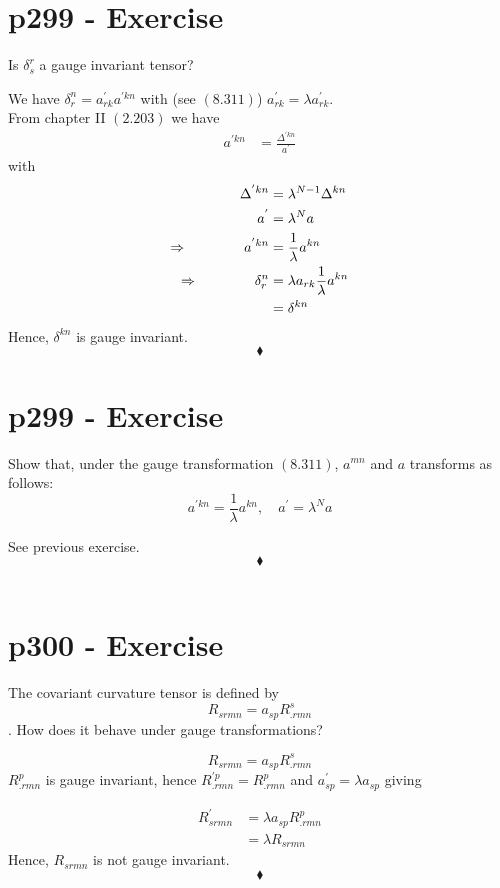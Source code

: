 \section{p299 - Exercise}
\begin{tcolorbox}
Is $\delta^r_s$ a gauge invariant tensor?
\end{tcolorbox}
We have $\delta^n_r = a^{'}_{rk} a^{'kn} $ with (see $\mathbf{(8.311)}$) $a^{'}_{rk}= \lambda a^{'}_{rk} $.\\
From chapter II $\mathbf{(2.203)}$ we have 
\begin{align}
a^{'kn} &= \frac{\Delta^{'kn}}{a^{'}}
\end{align}
with
\begin{align}
\Delta^{'kn} &= \lambda^{N-1}\Delta^{kn}\\
a^{'}&= \lambda^N a\\
\Rightarrow\quad\quad\quad\quad a^{'kn} &= \frac{ 1}{\lambda} a^{kn}\\
\Rightarrow\quad\quad\quad\quad \delta^n_r &= \lambda a_{rk}\frac{ 1}{\lambda} a^{kn}\\
&= \delta^{kn} 
\end{align}
Hence, $ \delta^{kn} $ is gauge invariant.
$$\blacklozenge$$
\newpage
\section{p299 - Exercise}
\begin{tcolorbox}
Show that, under the gauge transformation $\mathbf{(8.311)}$, $a^{mn}$ and $a$ transforms as follows:
$$a^{'kn} = \frac{ 1}{\lambda} a^{kn},\quad a^{'}= \lambda^N a $$
\end{tcolorbox}
See previous exercise.
$$\blacklozenge$$\\

\section{p300 - Exercise}
\begin{tcolorbox}
The covariant curvature tensor is defined by $$R_{srmn} = a_{sp}R^s_{.rmn}$$.
How does it behave under gauge transformations?
\end{tcolorbox}
 $$R_{srmn} = a_{sp}R^s_{.rmn}$$
 $R^p_{.rmn} $ is gauge invariant, hence $R^{'p}_{.rmn} =R^p_{.rmn} $ and $a^{'}_{sp}= \lambda a^{}_{sp} $ giving
 
 \begin{align}
 R^{'}_{srmn} &=\lambda a^{}_{sp}R^p_{.rmn}\\
 &=\lambda R_{srmn}
 \end{align}
 Hence, $R_{srmn}$ is not gauge invariant.
$$\blacklozenge$$\\
\newpage


